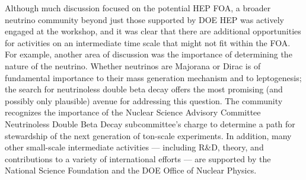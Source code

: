 Although much discussion focused on the potential HEP FOA, a broader
neutrino community beyond just those supported by DOE HEP was actively
engaged at the workshop, and it was clear that there are additional
opportunities for activities on an intermediate time scale that might
not fit within the FOA.  For example, another area of discussion was
the importance of determining the nature of the neutrino.  Whether
neutrinos are Majorana or Dirac is of fundamental importance to their
mass generation mechanism and to leptogenesis; the search for
neutrinoless double beta decay offers the most promising (and possibly
only plausible) avenue for addressing this question.  The community
recognizes the importance of the Nuclear Science Advisory Committee Neutrinoless Double
Beta Decay subcommittee's charge to determine a path for stewardship
of the next generation of ton-scale experiments.  In addition, many
other small-scale intermediate activities --- including R\&D, theory,
and contributions to a variety of international efforts --- are
supported by the National Science Foundation and the DOE Office of
Nuclear Physics.









